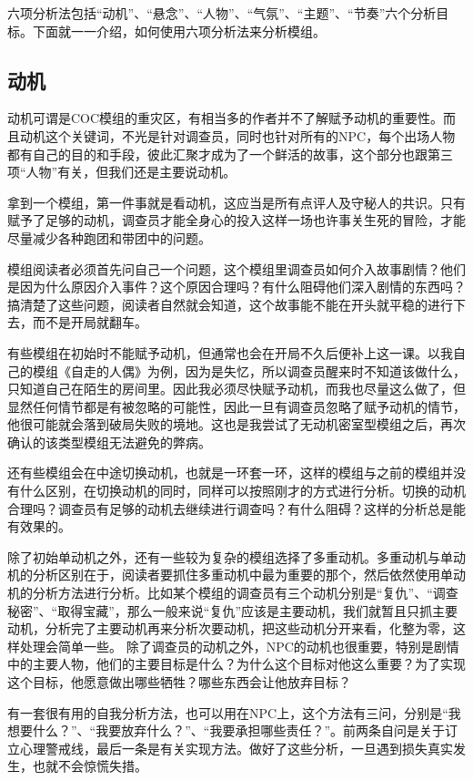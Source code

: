 \documentclass[a4paper,zihao=-4,notitlepage,twoside,openright]{ctexart}
\begin{document}
六项分析法包括“动机”、“悬念”、“人物”、“气氛”、“主题”、“节奏”六个分析目标。下面就一一介绍，如何使用六项分析法来分析模组。

\subsection{动机}

动机可谓是COC模组的重灾区，有相当多的作者并不了解赋予动机的重要性。而且动机这个关键词，不光是针对调查员，同时也针对所有的NPC，每个出场人物都有自己的目的和手段，彼此汇聚才成为了一个鲜活的故事，这个部分也跟第三项“人物”有关，但我们还是主要说动机。

拿到一个模组，第一件事就是看动机，这应当是所有点评人及守秘人的共识。只有赋予了足够的动机，调查员才能全身心的投入这样一场也许事关生死的冒险，才能尽量减少各种跑团和带团中的问题。

模组阅读者必须首先问自己一个问题，这个模组里调查员如何介入故事剧情？他们是因为什么原因介入事件？这个原因合理吗？有什么阻碍他们深入剧情的东西吗？搞清楚了这些问题，阅读者自然就会知道，这个故事能不能在开头就平稳的进行下去，而不是开局就翻车。

有些模组在初始时不能赋予动机，但通常也会在开局不久后便补上这一课。以我自己的模组《自走的人偶》为例，因为是失忆，所以调查员醒来时不知道该做什么，只知道自己在陌生的房间里。因此我必须尽快赋予动机，而我也尽量这么做了，但显然任何情节都是有被忽略的可能性，因此一旦有调查员忽略了赋予动机的情节，他很可能就会落到破局失败的境地。这也是我尝试了无动机密室型模组之后，再次确认的该类型模组无法避免的弊病。

还有些模组会在中途切换动机，也就是一环套一环，这样的模组与之前的模组并没有什么区别，在切换动机的同时，同样可以按照刚才的方式进行分析。切换的动机合理吗？调查员有足够的动机去继续进行调查吗？有什么阻碍？这样的分析总是能有效果的。

除了初始单动机之外，还有一些较为复杂的模组选择了多重动机。多重动机与单动机的分析区别在于，阅读者要抓住多重动机中最为重要的那个，然后依然使用单动机的分析方法进行分析。比如某个模组的调查员有三个动机分别是“复仇”、“调查秘密”、“取得宝藏”，那么一般来说“复仇”应该是主要动机，我们就暂且只抓主要动机，分析完了主要动机再来分析次要动机，把这些动机分开来看，化整为零，这样处理会简单一些。 除了调查员的动机之外，NPC的动机也很重要，特别是剧情中的主要人物，他们的主要目标是什么？为什么这个目标对他这么重要？为了实现这个目标，他愿意做出哪些牺牲？哪些东西会让他放弃目标？

有一套很有用的自我分析方法，也可以用在NPC上，这个方法有三问，分别是“我想要什么？”、“我要放弃什么？”、“我要承担哪些责任？”。前两条自问是关于订立心理警戒线，最后一条是有关实现方法。做好了这些分析，一旦遇到损失真实发生，也就不会惊慌失措。
\end{document}
